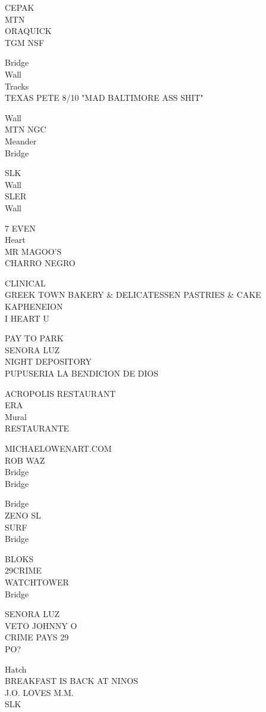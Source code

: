 \documentclass[10pt,letterpaper]{article}
\begin{document}
CEPAK\\
MTN\\
ORAQUICK\\
TGM NSF

Bridge\\
Wall\\
Tracks\\
TEXAS PETE 8/10 "MAD BALTIMORE ASS SHIT"

Wall\\
MTN NGC\\
Meander\\
Bridge

SLK\\
Wall\\
SLER\\
Wall

7 EVEN\\
Heart\\
MR MAGOO'S\\
CHARRO NEGRO

CLINICAL\\
GREEK TOWN BAKERY \& DELICATESSEN PASTRIES \& CAKE\\
KAPHENEION\\
I HEART U

PAY TO PARK\\
SENORA LUZ\\
NIGHT DEPOSITORY\\
PUPUSERIA LA BENDICION DE DIOS

ACROPOLIS RESTAURANT\\
ERA\\
Mural\\
RESTAURANTE

MICHAELOWENART.COM\\
ROB WAZ\\
Bridge\\
Bridge

Bridge\\
ZENO SL\\
SURF\\
Bridge

BLOKS\\
29CRIME\\
WATCHTOWER\\
Bridge

SENORA LUZ\\
VETO JOHNNY O\\
CRIME PAYS 29\\
PO?

Hatch\\
BREAKFAST IS BACK AT NINOS\\
J.O. LOVES M.M.\\
SLK
\end{document}
